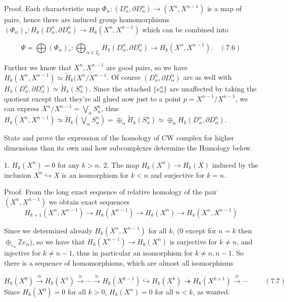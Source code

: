 Proof. 
Each characteristic map \(\Phi_\alpha : (D^n_\alpha, \partial D^n_\alpha) \to (X^n, X^{n-1})\) is a map of pairs, 
hence there are induced group homomorphisms \((\Phi_\alpha)_* : H_k(D^n_\alpha, \partial D^n_\alpha) \to H_k(X^n, X^{n-1})\) which can be combined into

\[
\Psi = \bigoplus (\Phi_\alpha)_* : \bigoplus_{\alpha \in I_n} H_k(D^n_\alpha, \partial D^n_\alpha) \longrightarrow H_k(X^n, X^{n-1}). 
\quad (7.6)
\]

Further we know that \( X^n, X^{n-1} \) are good pairs, so we have \( H_k(X^n, X^{n-1}) \simeq \tilde{H}_k(X^n / X^{n-1} \).
Of course \((D^n_\alpha, \partial D^n_\alpha)\) are as well with \( H_k(D^n_\alpha, \partial D^n_\alpha) \simeq \tilde{H}_k(S^n_\alpha) \).
Since the attached \( \{e^n_\alpha\} \) are unaffected by taking the quotient except that they're all glued now just to a point \( p = X^{n-1}/X^{n-1} \),
we can express \( X^n/X^{n-1} = \bigvee_\alpha S^n_\alpha \), thus
\( H_k(X^n, X^{n-1}) \simeq \tilde{H}_k(\bigvee_\alpha S^n_\alpha) = \oplus_\alpha \tilde{H}_k(S^n_\alpha) \simeq \oplus_\alpha H_k(D^n_\alpha, \partial D^n_\alpha) \).


State and prove the expression of the homology of CW complex for higher dimensions than its own and how subcomplexes 
determine the Homology below.

1. \(H_k(X^n) = 0\) for any \(k > n\).
2. The map \(H_k(X^n) \to H_k(X)\) induced by the inclusion \(X^n \hookrightarrow X\) is an isomorphism for \(k < n\) and surjective for \(k = n\). 

Proof. 
From the long exact sequence of relative homology of the pair \((X^n, X^{n-1})\) we obtain exact sequences 
\[
H_{k+1}(X^n, X^{n-1}) \to H_k(X^{n-1}) \to H_k(X^n) \to H_k(X^n, X^{n-1})
\]

Since we determined already \(H_{k}(X^n, X^{n-1})\) for all \( k \), (\( 0 \) except for \( n = k \) then \( \oplus_{e_\alpha} \mathbb{Z}e_\alpha \)), so
we have that \(H_k(X^{n-1}) \rightarrow H_k(X^n)\) is surjective for \(k \neq n\), and injective for \(k \neq n-1\), thus in particular an isomorphism for 
\(k \neq n, n-1\). So there is a sequence of homomorphisms, which are almost all isomorphisms

\( H_k(X^0) \xrightarrow{\cong} H_k(X^1) \xrightarrow{\cong} \dotsb \xrightarrow{\cong} H_k(X^{k-1}) \hookrightarrow H_k(X^k) \twoheadrightarrow H_k(X^{k+1}) \xrightarrow{\cong} \dotsb \hspace{1cm} (7.7) \)
Since \(H_k(X^0) = 0\) for all \(k > 0\), \(H_k(X^n) = 0\) for all \(n < k\), as wanted.

